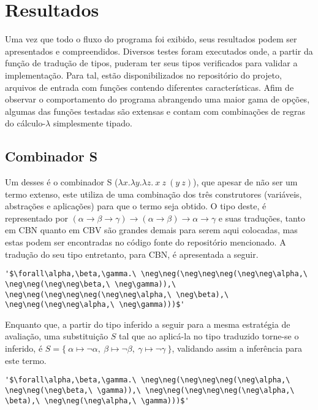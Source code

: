 \section{Resultados}\label{sec:resultados}
Uma vez que todo o fluxo do programa foi exibido, seus resultados podem ser apresentados e compreendidos.
Diversos testes foram executados onde, a partir da função de tradução de tipos, puderam ter seus tipos verificados para validar a implementação.
Para tal, estão disponibilizados no repositório do projeto, arquivos de entrada com funções contendo diferentes características.
Afim de observar o comportamento do programa abrangendo uma maior gama de opções, algumas das funções testadas são extensas e contam com combinações de regras do cálculo-$\lambda$ simplesmente tipado.

\subsection{Combinador S}
Um desses é o combinador S ($\lambda x.\lambda y.\lambda z.\ x\ z\ (y\ z)$), que apesar de não ser um termo extenso, este utiliza de uma combinação dos três construtores (variáveis, abstrações e aplicações) para que o termo seja obtido.
O tipo deste, é representado por $(\alpha \to \beta \to \gamma) \to (\alpha \to \beta) \to \alpha \to \gamma$ e suas traduções, tanto em CBN quanto em CBV são grandes demais para serem aqui colocadas, mas estas podem ser encontradas no código fonte do repositório mencionado.
A tradução do seu tipo entretanto, para CBN, é apresentada a seguir.
\lstset{extendedchars=false, escapeinside=''}
\begin{lstlisting}[style=output,caption={Tradução em CBN do tipo do combinador S}]
  '$\forall\alpha,\beta,\gamma.\ \neg\neg(\neg\neg\neg(\neg\neg\alpha,\ \neg\neg(\neg\neg\beta,\ \neg\gamma)),\ \neg\neg(\neg\neg\neg(\neg\neg\alpha,\ \neg\beta),\ \neg\neg(\neg\neg\alpha,\ \neg\gamma)))$'
\end{lstlisting}
Enquanto que, a partir do tipo inferido a seguir para a mesma estratégia de avaliação, uma substituição $S$ tal que ao aplicá-la no tipo traduzido torne-se o inferido, é $S = \{\ \alpha \mapsto \neg\alpha,\ \beta \mapsto \neg\beta,\ \gamma \mapsto \neg\gamma\ \}$, validando assim a inferência para este termo.
\lstset{extendedchars=false, escapeinside=''}
\begin{lstlisting}[style=output,caption={Inferência do tipo do combinador S traduzido em CBN}]
  '$\forall\alpha,\beta,\gamma.\ \neg\neg(\neg\neg\neg(\neg\alpha,\ \neg\neg(\neg\beta,\ \gamma)),\ \neg\neg(\neg\neg\neg(\neg\alpha,\ \beta),\ \neg\neg(\neg\alpha,\ \gamma)))$'
\end{lstlisting}
